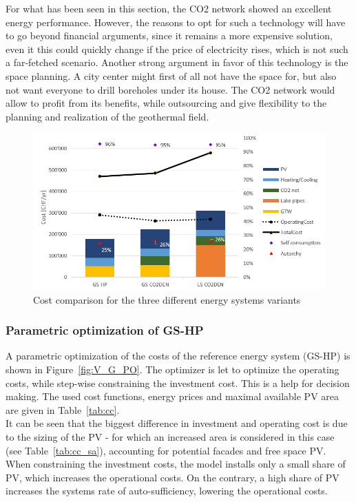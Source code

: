 \documentclass{article}
\begin{document}
For what has been seen in this section, the CO2 network showed an excellent energy performance. However, the reasons to opt for such a technology will have to go beyond financial arguments, since it remains a more expensive solution, even it this could quickly change if the price of electricity rises, which is not such a far-fetched scenario. Another strong argument in favor of this technology is the space planning. A city center might first of all not have the space for, but also not want everyone to drill boreholes under its house. The CO2 network would allow to profit from its benefits, while outsourcing and give flexibility to the planning and realization of the geothermal field.

\begin{figure}[htp]
	\centering
	\includegraphics[width=1\textwidth]{V_costs.PNG}
	\caption{Cost comparison for the three different energy systems variants}
	\label{fig:V_costs}
\end{figure}


\subsubsection{Parametric optimization of GS-HP}
A parametric optimization of the costs of the reference energy system (GS-HP) is shown in Figure~\ref{fig:V_G_PO}. The optimizer is let to optimize the operating costs, while step-wise constraining the investment cost. This is a help for decision making. The used cost functions, energy prices and maximal available PV area are given in Table~\ref{tab:cc}. \\ 



It can be seen that the biggest difference in investment and operating cost is due to the sizing of the PV - for which an increased area is considered in this case (see Table~\ref{tab:cc_sa}), accounting for potential facades and free space PV. When constraining the investment costs, the model installs only a small share of PV, which increases the operational costs. On the contrary, a high share of PV increases the systems rate of auto-sufficiency, lowering the operational costs. 
\end{document}
